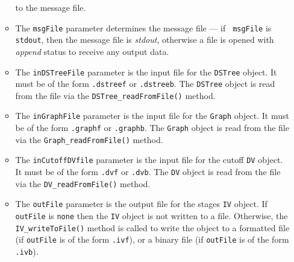 \begin{enumerate}
\begin{itemize}
to the message file.
\item
The {\tt msgFile} parameter determines the message file --- if {\tt
msgFile} is {\tt stdout}, then the message file is {\it stdout},
otherwise a file is opened with {\it append} status to receive any
output data.
\item
The {\tt inDSTreeFile} parameter is the input file for the {\tt DSTree}
object. It must be of the form {\tt *.dstreef} or {\tt *.dstreeb}.
The {\tt DSTree} object is read from the file via the
{\tt DSTree\_readFromFile()} method.
\item
The {\tt inGraphFile} parameter is the input file for the {\tt Graph}
object. It must be of the form {\tt *.graphf} or {\tt *.graphb}.
The {\tt Graph} object is read from the file via the
{\tt Graph\_readFromFile()} method.
\item
The {\tt inCutoffDVfile} parameter is the input file for the cutoff
{\tt DV} object. 
It must be of the form {\tt *.dvf} or {\tt *.dvb}.
The {\tt DV} object is read from the file via the
{\tt DV\_readFromFile()} method.
\item
The {\tt outFile} parameter is the output file for the stages {\tt IV}
object. 
If {\tt outFile} is {\tt none} then the {\tt IV} object is not
written to a file. 
Otherwise, the {\tt IV\_writeToFile()} method is called to write
the object to 
a formatted file (if {\tt outFile} is of the form {\tt *.ivf}),
or
a binary file (if {\tt outFile} is of the form {\tt *.ivb}).
\end{itemize}
\end{enumerate}
